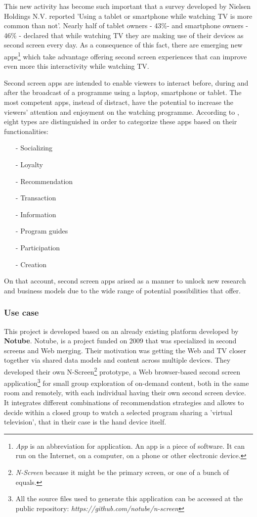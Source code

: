 \documentclass{acm_proc_article-sp}
\begin{document}
This new activity has become such important that a survey developed by Nielsen Holdings N.V. \cite{nielsentv} reported 'Using a tablet or smartphone while watching TV is more common than not'. Nearly half of tablet owners - 43\%- and smartphone owners - 46\% - declared that while watching TV they are making use of their devices as second screen every day. As a consequence of this fact, there are emerging new apps\footnote{\textit{App} is an abbreviation for application. An app is a piece of software. It can run on the Internet, on a computer, on a phone or other electronic device.} which take advantage offering second screen experiences that can improve even more this interactivity while watching TV. 

Second screen apps \cite{evolumedia1} are intended to enable viewers to interact before, during and after the broadcast of a programme using a laptop, smartphone or tablet. The most competent apps, instead of distract, have the potential to increase the viewers' attention and enjoyment on the watching programme. According to \cite{evolumedia1}, eight types are distinguished in order to categorize these apps based on their functionalities: 
\begin{itemize}
  \item[-] Socializing
  \item[-] Loyalty
  \item[-] Recommendation
  \item[-] Transaction
  \item[-] Information
  \item[-] Program guides
  \item[-] Participation
  \item[-] Creation
\end{itemize}
On that account, second screen apps arised as a manner to unlock new research and business models due to the wide range of potential possibilities that offer. 

\subsubsection{Use case}

This project is developed based on an already existing platform developed by \textbf{Notube}\cite{aroyo2009notube}. Notube, is a project funded on 2009 that was specialized in second screens and Web merging. Their motivation was getting the Web and TV closer together via shared data models and content across multiple devices. They developed their own N-Screen\footnote{\textit{N-Screen} because it might be the primary screen, or one of a bunch of equals.} prototype, a Web browser-based second screen application\footnote{All the source files used to generate this application can be accessed at the public repository:
\textit{https://github.com/notube/n-screen}} for small group exploration of on-demand content, both in the same room and remotely, with each individual having their own second screen device. It integrates different combinations of recommendation strategies and allows to decide within a closed group to watch a selected program sharing a 'virtual television', that in their case is the hand device itself. 
\end{document}
